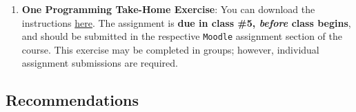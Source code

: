 \documentclass[letterpaper]{article}\usepackage[]{graphicx}\usepackage[svgnames]{xcolor}
\begin{document}
\begin{enumerate}
\item {\bf One Programming Take-Home Exercise}: You can download the instructions \href{https://github.com/hbahamonde/Exp_Soc_Science/raw/main/Lectures/Labs/Conjoint/Conjoint_Lab.pdf}{here}. The assignment is {\bf due in class \#5, \emph{before} class begins}, and should be submitted in the respective \texttt{Moodle} assignment section of the course. This exercise may be completed in groups; however, individual assignment submissions are required.



  


\end{enumerate}



\subsection*{Recommendations}
\end{document}
